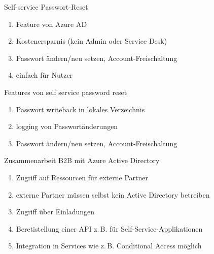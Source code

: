 
\begin{flashcard}[Definition]{Self-service Passwort-Reset}
  \begin{enumerate}
    \item Feature von Azure AD
    \item Kostenersparnis (kein Admin oder Service Desk)
    \item Passwort ändern/neu setzen, Account-Freischaltung
    \item einfach für Nutzer
  \end{enumerate}
\end{flashcard}

\begin{flashcard}[Definition]{Features von self service password reset}
  \begin{enumerate}
    \item Passwort writeback in lokales Verzeichnis
    \item logging von Passwortänderungen
    \item Passwort ändern/neu setzen, Account-Freischaltung
  \end{enumerate}
\end{flashcard}


\begin{flashcard}[Definition]{Zusammenarbeit B2B mit Azure Active Directory}
  \begin{enumerate}
    \item Zugriff auf Ressourcen für externe Partner
    \item externe Partner müssen selbst kein Active Directory betreiben
    \item Zugriff über Einladungen
    \item Beretistellung einer API z.\,B. für Self-Service-Applikationen
    \item Integration in Services wie z.\,B. Conditional Access möglich
  \end{enumerate}
\end{flashcard}

